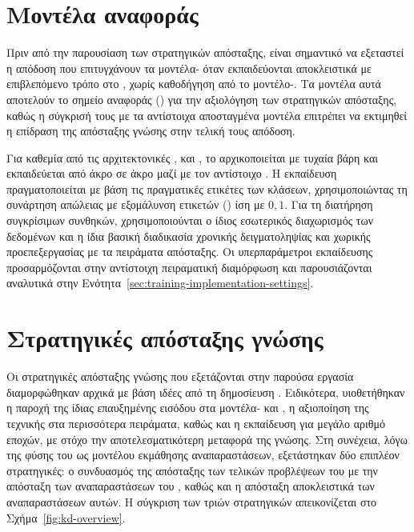 \section{Μοντέλα αναφοράς}
\label{sec:baseline-models}

Πριν από την παρουσίαση των στρατηγικών απόσταξης, είναι σημαντικό να
εξεταστεί η απόδοση που επιτυγχάνουν τα μοντέλα- όταν
εκπαιδεύονται αποκλειστικά με επιβλεπόμενο τρόπο στο , χωρίς
καθοδήγηση από το μοντέλο-. Τα μοντέλα αυτά αποτελούν το
σημείο αναφοράς () για την αξιολόγηση των
στρατηγικών απόσταξης, καθώς η σύγκρισή τους με τα αντίστοιχα
αποσταγμένα μοντέλα επιτρέπει να εκτιμηθεί η επίδραση της απόσταξης
γνώσης στην τελική τους απόδοση.

Για καθεμία από τις αρχιτεκτονικές ,  και
, το  αρχικοποιείται με τυχαία βάρη και
εκπαιδεύεται από άκρο σε άκρο μαζί με τον αντίστοιχο .
Η εκπαίδευση πραγματοποιείται με βάση τις πραγματικές ετικέτες των
κλάσεων, χρησιμοποιώντας τη συνάρτηση απώλειας  με
εξομάλυνση ετικετών () ίση με \(0{,}1\). Για τη διατήρηση συγκρίσιμων συνθηκών, χρησιμοποιούνται ο ίδιος
εσωτερικός διαχωρισμός των δεδομένων και η ίδια βασική διαδικασία
χρονικής δειγματοληψίας και χωρικής προεπεξεργασίας με τα πειράματα
απόσταξης. Οι υπερπαράμετροι εκπαίδευσης προσαρμόζονται στην αντίστοιχη
πειραματική διαμόρφωση και παρουσιάζονται αναλυτικά στην
Ενότητα~\ref{sec:training-implementation-settings}.

\section{Στρατηγικές απόσταξης γνώσης}
\label{sec:distillation-strategies}

Οι στρατηγικές απόσταξης γνώσης που εξετάζονται στην παρούσα εργασία
διαμορφώθηκαν αρχικά με βάση ιδέες από τη δημοσίευση
\cite{beyer2022knowledge}. Ειδικότερα, υιοθετήθηκαν η παροχή της ίδιας
επαυξημένης εισόδου στα μοντέλα- και , η
αξιοποίηση της τεχνικής  στα περισσότερα πειράματα, καθώς και
η εκπαίδευση για μεγάλο αριθμό εποχών, με στόχο την αποτελεσματικότερη
μεταφορά της γνώσης. Στη συνέχεια, λόγω της φύσης του  ως
μοντέλου εκμάθησης αναπαραστάσεων, εξετάστηκαν δύο επιπλέον στρατηγικές:
ο συνδυασμός της απόσταξης των τελικών προβλέψεων του
 με την απόσταξη των αναπαραστάσεων του
, καθώς και η απόσταξη αποκλειστικά των αναπαραστάσεων
αυτών. Η σύγκριση των τριών στρατηγικών απεικονίζεται στο
Σχήμα~\ref{fig:kd-overview}.


